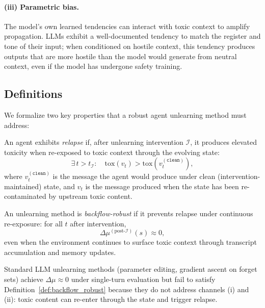 \paragraph{(iii) Parametric bias.}
The model's own learned tendencies can interact with toxic context to amplify propagation.
LLMs exhibit a well-documented tendency to match the register and tone of their input; when conditioned on hostile context, this tendency produces outputs that are more hostile than the model would generate from neutral context, even if the model has undergone safety training.

\subsection{Definitions}

We formalize two key properties that a robust agent unlearning method must address:

\begin{definition}
\label{def:relapse}
An agent exhibits \emph{relapse} if, after unlearning intervention $\mathcal{I}$, it produces elevated toxicity when re-exposed to toxic context through the evolving state:
\begin{equation}
    \exists\, t > t_{\mathcal{I}}:\quad \mathrm{tox}(v_t) > \mathrm{tox}(v_t^{(\texttt{clean})}),
\end{equation}
where $v_t^{(\texttt{clean})}$ is the message the agent would produce under clean (intervention-maintained) state, and $v_t$ is the message produced when the state has been re-contaminated by upstream toxic content.
\end{definition}

\begin{definition}
\label{def:backflow_robust}
An unlearning method is \emph{backflow-robust} if it prevents relapse under continuous re-exposure: for all $t$ after intervention,
\begin{equation}
    \Delta\mu^{(\text{post-}\mathcal{I})}(s) \approx 0,
\end{equation}
even when the environment continues to surface toxic context through transcript accumulation and memory updates.
\end{definition}

Standard LLM unlearning methods (parameter editing, gradient ascent on forget sets) achieve $\Delta\mu \approx 0$ under single-turn evaluation but fail to satisfy Definition~\ref{def:backflow_robust} because they do not address channels (i) and (ii): toxic content can re-enter through the state and trigger relapse.

